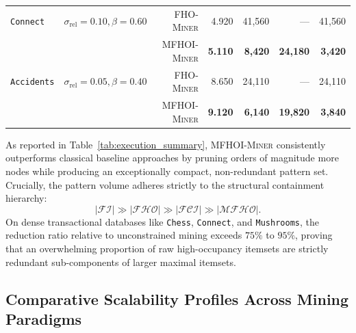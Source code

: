 \documentclass[runningheads,orivec]{llncs}
\newcommand{\FI}{\ensuremath{\mathcal{FI}}}
\newcommand{\FHO}{\ensuremath{\mathcal{FHO}}}
\newcommand{\FCI}{\ensuremath{\mathcal{FCI}}}
\newcommand{\MFHOI}{\ensuremath{\mathcal{MFHO}}}
\newcommand{\MFHOIMiner}{\textsc{MFHOI-Miner}}
\begin{document}
\begin{table}[htbp]
{\begin{tabular}{llr rrrr}
\midrule
\texttt{Connect}   & $\sigma_{\mathrm{rel}}=0.10, \beta=0.60$ & \textsc{FHO-Miner} & 4.920 & 41,560 & --- & 41,560 \\
                   &                                           & \MFHOIMiner{} & \textbf{5.110} & \textbf{8,420} & \textbf{24,180} & \textbf{3,420} \\
\midrule
\texttt{Accidents} & $\sigma_{\mathrm{rel}}=0.05, \beta=0.40$ & \textsc{FHO-Miner} & 8.650 & 24,110 & --- & 24,110 \\
                   &                                           & \MFHOIMiner{} & \textbf{9.120} & \textbf{6,140} & \textbf{19,820} & \textbf{3,840} \\
\bottomrule
\end{tabular}
}
\end{table}

As reported in Table~\ref{tab:execution_summary}, \MFHOIMiner{} consistently outperforms classical baseline approaches by pruning orders of magnitude more nodes while producing an exceptionally compact, non-redundant pattern set. Crucially, the pattern volume adheres strictly to the structural containment hierarchy:
\begin{equation}
|\FI| \gg |\FHO| \gg |\FCI| \gg |\MFHOI|.
\end{equation}
On dense transactional databases like \texttt{Chess}, \texttt{Connect}, and \texttt{Mushrooms}, the reduction ratio relative to unconstrained mining exceeds $75\%$ to $95\%$, proving that an overwhelming proportion of raw high-occupancy itemsets are strictly redundant sub-components of larger maximal itemsets.


\subsection{Comparative Scalability Profiles Across Mining Paradigms}
\label{sec:multiminer_scalability}
\end{document}
